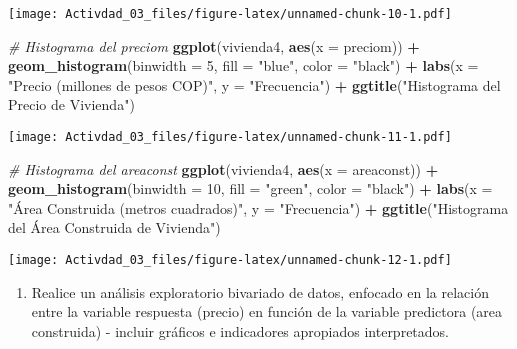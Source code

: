 \documentclass[
]{article}
\newenvironment{Shaded}{\begin{snugshade}}{\end{snugshade}}
\newcommand{\AttributeTok}[1]{\textcolor[rgb]{0.13,0.29,0.53}{#1}}
\newcommand{\CommentTok}[1]{\textcolor[rgb]{0.56,0.35,0.01}{\textit{#1}}}
\newcommand{\DecValTok}[1]{\textcolor[rgb]{0.00,0.00,0.81}{#1}}
\newcommand{\FunctionTok}[1]{\textcolor[rgb]{0.13,0.29,0.53}{\textbf{#1}}}
\newcommand{\NormalTok}[1]{#1}
\newcommand{\SpecialCharTok}[1]{\textcolor[rgb]{0.81,0.36,0.00}{\textbf{#1}}}
\newcommand{\StringTok}[1]{\textcolor[rgb]{0.31,0.60,0.02}{#1}}
\providecommand{\tightlist}{%
  \setlength{\itemsep}{0pt}\setlength{\parskip}{0pt}}
\begin{document}
\texttt{[image: Activdad\_03\_files/figure-latex/unnamed-chunk-10-1.pdf]}

\begin{Shaded}
\begin{Highlighting}[]
\CommentTok{\# Histograma del preciom}
\FunctionTok{ggplot}\NormalTok{(vivienda4, }\FunctionTok{aes}\NormalTok{(}\AttributeTok{x =}\NormalTok{ preciom)) }\SpecialCharTok{+}
  \FunctionTok{geom\_histogram}\NormalTok{(}\AttributeTok{binwidth =} \DecValTok{5}\NormalTok{, }\AttributeTok{fill =} \StringTok{"blue"}\NormalTok{, }\AttributeTok{color =} \StringTok{"black"}\NormalTok{) }\SpecialCharTok{+}
  \FunctionTok{labs}\NormalTok{(}\AttributeTok{x =} \StringTok{"Precio (millones de pesos COP)"}\NormalTok{, }\AttributeTok{y =} \StringTok{"Frecuencia"}\NormalTok{) }\SpecialCharTok{+}
  \FunctionTok{ggtitle}\NormalTok{(}\StringTok{"Histograma del Precio de Vivienda"}\NormalTok{)}
\end{Highlighting}
\end{Shaded}

\texttt{[image: Activdad\_03\_files/figure-latex/unnamed-chunk-11-1.pdf]}

\begin{Shaded}
\begin{Highlighting}[]
\CommentTok{\# Histograma del areaconst}
\FunctionTok{ggplot}\NormalTok{(vivienda4, }\FunctionTok{aes}\NormalTok{(}\AttributeTok{x =}\NormalTok{ areaconst)) }\SpecialCharTok{+}
  \FunctionTok{geom\_histogram}\NormalTok{(}\AttributeTok{binwidth =} \DecValTok{10}\NormalTok{, }\AttributeTok{fill =} \StringTok{"green"}\NormalTok{, }\AttributeTok{color =} \StringTok{"black"}\NormalTok{) }\SpecialCharTok{+}
  \FunctionTok{labs}\NormalTok{(}\AttributeTok{x =} \StringTok{"Área Construida (metros cuadrados)"}\NormalTok{, }\AttributeTok{y =} \StringTok{"Frecuencia"}\NormalTok{) }\SpecialCharTok{+}
  \FunctionTok{ggtitle}\NormalTok{(}\StringTok{"Histograma del Área Construida de Vivienda"}\NormalTok{)}
\end{Highlighting}
\end{Shaded}

\texttt{[image: Activdad\_03\_files/figure-latex/unnamed-chunk-12-1.pdf]}

\begin{enumerate}
\def\labelenumi{\arabic{enumi}.}
\setcounter{enumi}{1}
\tightlist
\item
  Realice un análisis exploratorio bivariado de datos, enfocado en la
  relación entre la variable respuesta (precio) en función de la
  variable predictora (area construida) - incluir gráficos e indicadores
  apropiados interpretados.
\end{enumerate}
\end{document}
